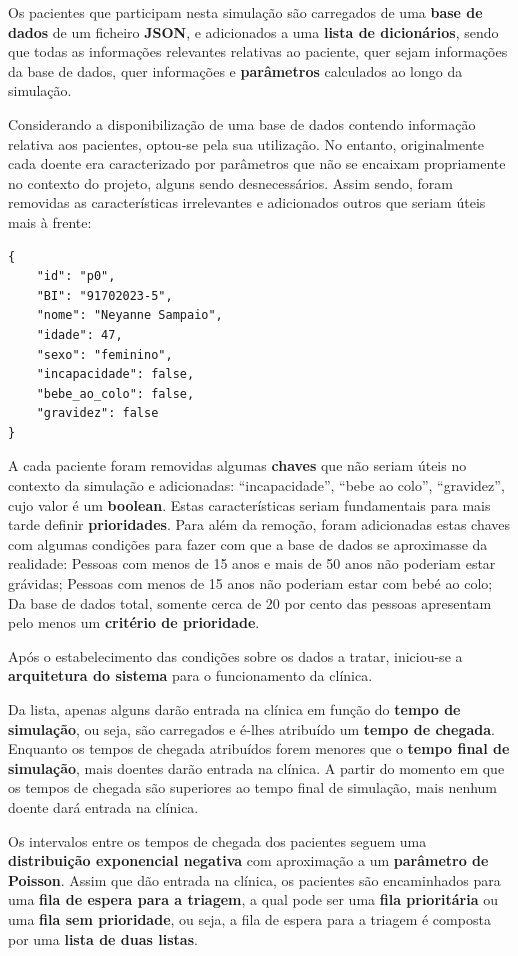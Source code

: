 \documentclass[12pt,a4paper]{article} %
\begin{document}
\medskip
Os pacientes que participam nesta simulação são carregados de uma \textbf{base de dados} de um ficheiro \textbf{JSON}, e adicionados a uma \textbf{lista de dicionários}, sendo que todas as informações relevantes relativas ao paciente, quer sejam informações da base de dados, quer informações e \textbf{parâmetros} calculados ao longo da simulação.
    
\medskip
Considerando a disponibilização de uma base de dados contendo informação relativa aos pacientes, optou-se pela sua utilização. No entanto, originalmente cada doente era caracterizado por parâmetros que não se encaixam propriamente no contexto do projeto, alguns sendo desnecessários. Assim sendo, foram removidas as características irrelevantes e adicionados outros que seriam úteis mais à frente:

\begin{verbatim}
{
    "id": "p0",
    "BI": "91702023-5",
    "nome": "Neyanne Sampaio",
    "idade": 47,
    "sexo": "feminino",
    "incapacidade": false,
    "bebe_ao_colo": false,
    "gravidez": false
}
\end{verbatim}

A cada paciente foram removidas algumas \textbf{chaves} que não seriam úteis no contexto da simulação e adicionadas: “incapacidade”, “bebe ao colo”, “gravidez”, cujo valor é um \textbf{boolean}. Estas características seriam fundamentais para mais tarde definir \textbf{prioridades}. Para além da remoção, foram adicionadas estas chaves com algumas condições para fazer com que a base de dados se aproximasse da realidade:
Pessoas com menos de 15 anos e mais de 50 anos não poderiam estar grávidas;
Pessoas com menos de 15 anos não poderiam estar com bebé ao colo;
Da base de dados total, somente cerca de 20 por cento das pessoas apresentam pelo menos um \textbf{critério de prioridade}.

Após o estabelecimento das condições sobre os dados a tratar, iniciou-se a \textbf{arquitetura do sistema} para o funcionamento da clínica. 

\medskip
Da lista, apenas alguns darão entrada na clínica em função do \textbf{tempo de simulação}, ou seja, são carregados e é-lhes atribuído um \textbf{tempo de chegada}. Enquanto os tempos de chegada atribuídos forem menores que o \textbf{tempo final de simulação}, mais doentes darão entrada na clínica. A partir do momento em que os tempos de chegada são superiores ao tempo final de simulação, mais nenhum doente dará entrada na clínica.

\medskip
Os intervalos entre os tempos de chegada dos pacientes seguem uma \textbf{distribuição exponencial negativa} com aproximação a um \textbf{parâmetro de Poisson}. Assim que dão entrada na clínica, os pacientes são encaminhados para uma \textbf{fila de espera para a triagem}, a qual pode ser uma \textbf{fila prioritária} ou uma \textbf{fila sem prioridade}, ou seja, a fila de espera para a triagem é composta por uma \textbf{lista de duas listas}. 
\end{document}
